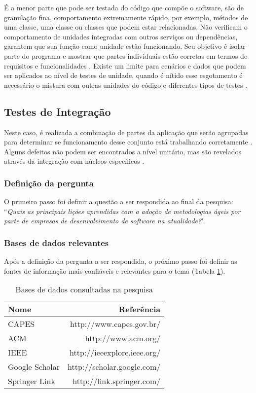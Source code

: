 É a menor parte que pode ser testada do código que compõe o software, são de granulação fina, comportamento extremamente rápido, por exemplo, métodos de uma classe, uma classe ou classes que podem estar relacionadas. Não verificam o comportamento de unidades integradas com outros serviços ou dependências, garantem que sua função como unidade estão funcionando. Seu objetivo é isolar parte do programa e mostrar que partes individuais estão corretas em termos de requisitos e funcionalidades \cite{James2012}.  Existe um limite para cenários e dados que podem ser aplicados ao nível de testes de unidade, quando é nítido esse esgotamento é necessário o mistura com outras unidades do código e diferentes tipos de testes \cite{XiangFeng2011}.

\subsection{Testes de Integração}

Neste caso, é realizada a combinação de partes da aplicação que serão agrupadas para determinar se funcionamento desse conjunto está trabalhando corretamente \cite{XiangFeng2011}. Alguns defeitos não podem ser encontrados a nível unitário, mas são revelados através da integração com núcleos específicos \cite{Pachawan2014}.




\subsubsection{Definição da pergunta}

O primeiro passo foi definir a questão a ser respondida ao final da pesquisa: ``\textit{Quais as principais lições aprendidas com a adoção de metodologias ágeis por parte de empresas de desenvolvimento de software na atualidade?}".

\subsubsection{Bases de dados relevantes}

Após a definição da pergunta a ser respondida, o próximo passo foi definir as fontes de informação mais confiáveis e relevantes para o tema (Tabela \ref{tab:basesDeDados}).

\begin{table}[H]
	\centering
	\begin{tabular}{| l | r |} \hline \textbf{Nome} & \textbf{Referência} \\ \hline
		CAPES & http://www.capes.gov.br/ \\ \hline
		ACM & http://www.acm.org/ \\ \hline
		IEEE & http://ieeexplore.ieee.org/ \\ \hline
		Google Scholar & http://scholar.google.com/ \\ \hline
		Springer Link & http://link.springer.com/ \\ \hline
	\end{tabular}
	\caption{Bases de dados consultadas na pesquisa}
	\label{tab:basesDeDados}
\end{table}

